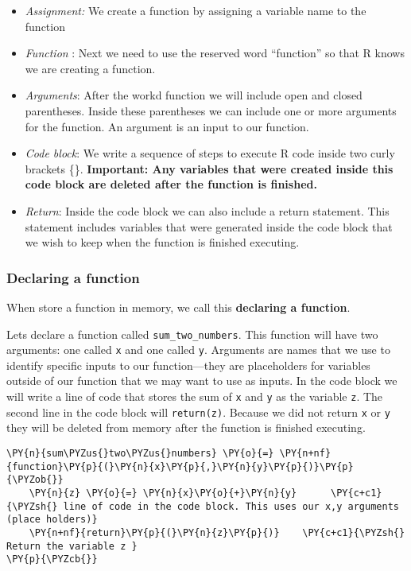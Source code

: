 \begin{itemize}
\tightlist
\item
  \emph{Assignment:} We create a function by assigning a variable name
  to the function
\item
  \emph{Function} : Next we need to use the reserved word ``function''
  so that R knows we are creating a function.
\item
  \emph{Arguments}: After the workd function we will include open and
  closed parentheses. Inside these parentheses we can include one or
  more arguments for the function. An argument is an input to our
  function.
\item
  \emph{Code block}: We write a sequence of steps to execute R code
  inside two curly brackets \{\}. \textbf{Important: Any variables that
  were created inside this code block are deleted after the function is
  finished.}
\item
  \emph{Return}: Inside the code block we can also include a return
  statement. This statement includes variables that were generated
  inside the code block that we wish to keep when the function is
  finished executing.
\end{itemize}

    \hypertarget{declaring-a-function}{%
\subsubsection{Declaring a function}\label{declaring-a-function}}

When store a function in memory, we call this \textbf{declaring a
function}.

Lets declare a function called \texttt{sum\_two\_numbers}. This function
will have two arguments: one called \texttt{x} and one called
\texttt{y}. Arguments are names that we use to identify specific inputs
to our function---they are placeholders for variables outside of our
function that we may want to use as inputs. In the code block we will
write a line of code that stores the sum of \texttt{x} and \texttt{y} as
the variable \texttt{z}. The second line in the code block will
\texttt{return(z)}. Because we did not return \texttt{x} or \texttt{y}
they will be deleted from memory after the function is finished
executing.

    \begin{tcolorbox}[breakable, size=fbox, boxrule=1pt, pad at break*=1mm,colback=cellbackground, colframe=cellborder]
\begin{Verbatim}[commandchars=\\\{\}]
\PY{n}{sum\PYZus{}two\PYZus{}numbers} \PY{o}{=} \PY{n+nf}{function}\PY{p}{(}\PY{n}{x}\PY{p}{,}\PY{n}{y}\PY{p}{)}\PY{p}{\PYZob{}}
    \PY{n}{z} \PY{o}{=} \PY{n}{x}\PY{o}{+}\PY{n}{y}      \PY{c+c1}{\PYZsh{} line of code in the code block. This uses our x,y arguments (place holders)}
    \PY{n+nf}{return}\PY{p}{(}\PY{n}{z}\PY{p}{)}    \PY{c+c1}{\PYZsh{} Return the variable z }
\PY{p}{\PYZcb{}}
\end{Verbatim}
\end{tcolorbox}

